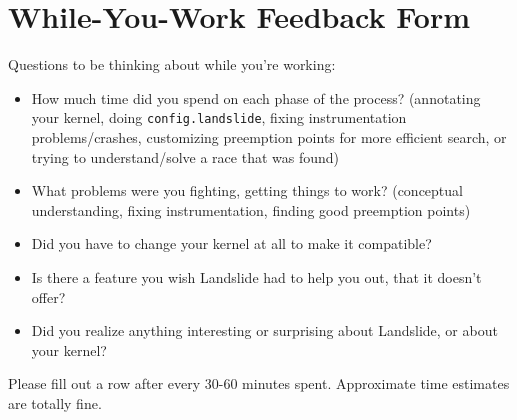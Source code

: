 \documentclass{article}
\begin{document}

\newpage
\appendix

\newpage
\section{While-You-Work Feedback Form}
\label{sec:30mins}

Questions to be thinking about while you're working:
\begin{itemize}
	\item How much time did you spend on each phase of the process? (annotating your kernel, doing \texttt{config.landslide}, fixing instrumentation problems/crashes, customizing preemption points for more efficient search, or trying to understand/solve a race that was found)
	\item What problems were you fighting, getting things to work? (conceptual understanding, fixing instrumentation, finding good preemption points)
	\item Did you have to change your kernel at all to make it compatible?
	\item Is there a feature you wish Landslide had to help you out, that it doesn't offer?
	\item Did you realize anything interesting or surprising about Landslide, or about your kernel?
\end{itemize}
Please fill out a row after every 30-60 minutes spent. Approximate time estimates are totally fine.
\end{document}
